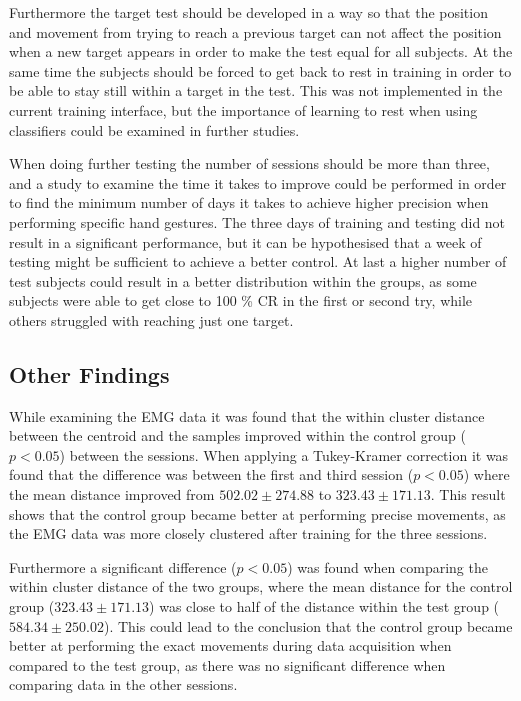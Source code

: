 Furthermore the target test should be developed in a way so that the position and movement from trying to reach a previous target can not affect the position when a new target appears in order to make the test equal for all subjects. At the same time the subjects should be forced to get back to rest in training in order to be able to stay still within a target in the test. This was not implemented in the current training interface, but the importance of learning to rest when using classifiers could be examined in further studies.

When doing further testing the number of sessions should be more than three, and a study to examine the time it takes to improve could be performed in order to find the minimum number of days it takes to achieve higher precision when performing specific hand gestures. The three days of training and testing did not result in a significant performance, but it can be hypothesised that a week of testing might be sufficient to achieve a better control. At last a higher number of test subjects could result in a better distribution within the groups, as some subjects were able to get close to 100 \% CR in the first or second try, while others struggled with reaching just one target. 

\subsection{Other Findings}
While examining the EMG data it was found that the within cluster distance between the centroid and the samples improved within the control group ($p < 0.05$) between the sessions. When applying a Tukey-Kramer correction it was found that the difference was between the first and third session ($p < 0.05$) where the mean distance improved from $502.02 \pm 274.88$ to $323.43 \pm 171.13$. This result shows that the control group became better at performing precise movements, as the EMG data was more closely clustered after training for the three sessions. 

Furthermore a significant difference ($p < 0.05$) was found when comparing the within cluster distance of the two groups, where the mean distance for the control group ($323.43 \pm 171.13$) was close to half of the distance within the test group ($584.34 \pm 250.02$). This could lead to the conclusion that the control group became better at performing the exact movements during data acquisition when compared to the test group, as there was no significant difference when comparing data in the other sessions. 

